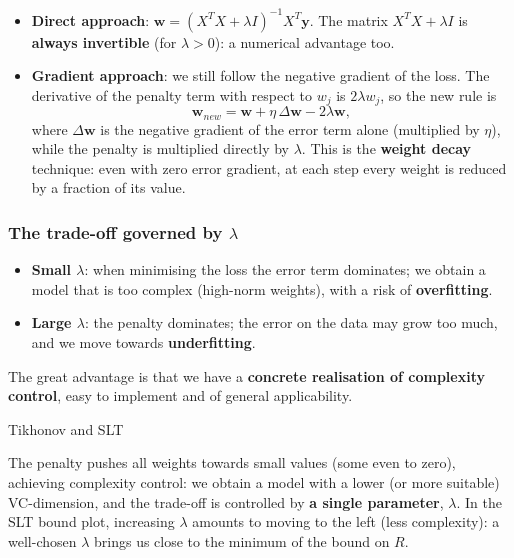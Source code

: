 \begin{itemize}
\tightlist
\item
  \textbf{Direct approach}:
  \(\mathbf{w} = (X^TX + \lambda I)^{-1}X^T\mathbf{y}\). The matrix
  \(X^TX + \lambda I\) is \textbf{always invertible} (for
  \(\lambda > 0\)): a numerical advantage too.
\item
  \textbf{Gradient approach}: we still follow the negative gradient of
  the loss. The derivative of the penalty term with respect to \(w_j\)
  is \(2\lambda w_j\), so the new rule is \[
  \mathbf{w}_{new} = \mathbf{w} + \eta\,\Delta\mathbf{w} - 2\lambda\mathbf{w},
  \] where \(\Delta\mathbf{w}\) is the negative gradient of the error
  term alone (multiplied by \(\eta\)), while the penalty is multiplied
  directly by \(\lambda\). This is the \textbf{weight decay} technique:
  even with zero error gradient, at each step every weight is reduced
  by a fraction of its value.
\end{itemize}

\subsubsection{\texorpdfstring{The trade-off governed by
\(\lambda\)}{The trade-off governed by \textbackslash lambda}}\label{il-compromesso-governato-da-lambda}

\begin{itemize}
\tightlist
\item
  \textbf{Small \(\lambda\)}: when minimising the loss the error term
  dominates; we obtain a model that is too complex (high-norm
  weights), with a risk of \textbf{overfitting}.
\item
  \textbf{Large \(\lambda\)}: the penalty dominates; the error on the
  data may grow too much, and we move towards \textbf{underfitting}.
\end{itemize}

The great advantage is that we have a \textbf{concrete realisation of
complexity control}, easy to implement and of general applicability.

\begin{boxtip}{Tikhonov and SLT}

The penalty pushes all weights towards small values (some even to
zero), achieving complexity control: we obtain a model with a lower (or
more suitable) VC-dimension, and the trade-off is controlled by
\textbf{a single parameter}, \(\lambda\). In the SLT bound plot,
increasing \(\lambda\) amounts to moving to the left (less
complexity): a well-chosen \(\lambda\) brings us close to the minimum
of the bound on \(R\).

\end{boxtip}

